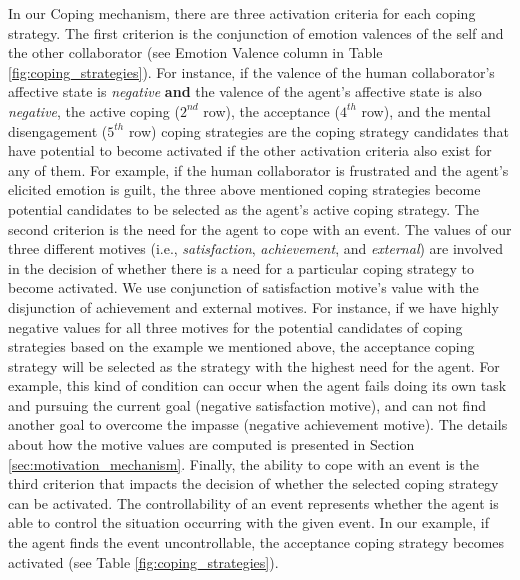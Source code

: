 \documentclass[12pt]{report}
\begin{document}
In our Coping mechanism, there are three activation criteria for each coping
strategy. The first criterion is the conjunction of emotion valences of the self
and the other collaborator (see Emotion Valence column in Table
\ref{fig:coping_strategies}). For instance, if the valence of the human
collaborator's affective state is \textit{negative} \textbf{and} the valence of the
agent's affective state is also \textit{negative}, the active coping ($2^{nd}$
row), the acceptance ($4^{th}$ row), and the mental disengagement ($5^{th}$ row)
coping strategies are the coping strategy candidates that have potential to
become activated if the other activation criteria also exist for any of them.
For example, if the human collaborator is frustrated and the agent's elicited
emotion is guilt, the three above mentioned coping strategies become potential
candidates to be selected as the agent's active coping strategy. The second
criterion is the need for the agent to cope with an event. The values of our
three different motives (i.e., \textit{satisfaction}, \textit{achievement}, and
\textit{external}) are involved in the decision of whether there is a need for a
particular coping strategy to become activated. We use conjunction of
satisfaction motive's value with the disjunction of achievement and external
motives. For instance, if we have highly negative values for all three motives
for the potential candidates of coping strategies based on the example we
mentioned above, the acceptance coping strategy will be selected as the strategy
with the highest need for the agent. For example, this kind of condition can
occur when the agent fails doing its own task and pursuing the current goal
(negative satisfaction motive), and can not find another goal to overcome the
impasse (negative achievement motive). The details about how the motive values
are computed is presented in Section \ref{sec:motivation_mechanism}. Finally,
the ability to cope with an event is the third criterion that impacts the
decision of whether the selected coping strategy can be activated. The
controllability of an event represents whether the agent is able to control the
situation occurring with the given event. In our example, if the agent finds the
event uncontrollable, the acceptance coping strategy becomes activated (see
Table \ref{fig:coping_strategies}).
\end{document}
